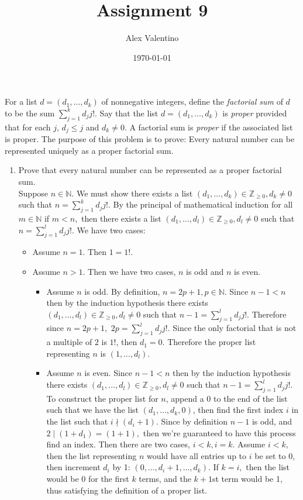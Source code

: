 \documentclass[12pt, letterpaper]{article}
\date{\today}
\author{Alex Valentino}
\title{Assignment 9}
\newcommand{\Z}{\mathbb{Z}}
\newcommand{\N}{\mathbb{N}}
\begin{document}
	For a list $d=(d_1,\ldots,d_k)$ of nonnegative integers, define the \emph{factorial sum} of $d$ to be the sum $\sum_{j=1}^k d_j j!$.  Say that the list $d=(d_1,\ldots,d_k)$ is \emph{proper}
provided that for each $j$, $d_j\leq j$ and $d_k \neq 0$.  A factorial sum is \emph{proper} if the associated list is proper. The purpose of this problem is to prove: Every natural number can be represented uniquely as a proper factorial sum.
\begin{enumerate}
\item
Prove that every natural number can be represented as a proper factorial sum. \\
	Suppose $n \in \N.$  We must show there exists a list $(d_1,\ldots,d_k) \in \Z_{\geq 0}, d_k \neq 0$ such that $n = \sum_{j=1}^k d_j j!.$  By the principal of mathematical induction for all $m \in \N$ if $m < n,$ then there exists a list  $(d_1,\ldots,d_l) \in \Z_{\geq 0}, d_l \neq 0$ such that $n = \sum_{j=1}^l d_j j!.$  We have two cases:
	\begin{itemize}
		\item Assume $n=1.$  Then $1=1!.$
		\item Assume $n>1.$  Then we have two cases, $n$ is odd and $n$ is even. \begin{itemize}
			\item  Assume $n$ is odd.  By definition, $n=2p+1, p \in \N.$  Since $n-1 < n$ then by the induction hypothesis there exists  $(d_1,\ldots,d_l) \in \Z_{\geq 0}, d_l \neq 0$ such that $n-1 = \sum_{j=1}^l d_j j!.$  Therefore since $n=2p+1,$ $2p = \sum_{j=1}^l d_j j!.$  Since the only factorial that is not a multiple of $2$ is $1!$, then $d_1 = 0.$  Therefore the proper list representing $n$ is $(1,\ldots,d_l)$.
			\item Assume $n$ is even.  Since $n-1 < n$ then by the induction hypothesis there exists  $(d_1,\ldots,d_l) \in \Z_{\geq 0}, d_l \neq 0$ such that $n-1 = \sum_{j=1}^l d_j j!.$ To construct the proper list for $n$, append a 0 to the end of the list such that we have the list $(d_1,\ldots, d_k,0)$, then find the first index $i$ in the list such that $i \nmid (d_i + 1)$.  Since by definition $n-1$ is odd, and $2 \mid (1+d_1) = (1+1),$ then we're guaranteed to have this process find an index.  Then there are two cases, $i < k, i = k.$  Assume $i < k,$ then the list representing $n$ would have all entries up to $i$ be set to 0, then increment $d_i$ by 1: $(0,\ldots, d_i +1, \ldots, d_k)$.  If  $k=i,$ then the list would be 0 for the first $k$ terms, and the $k+1$st term would be 1, thus satisfying the definition of a proper list. 

\end{itemize}
\end{itemize}
\end{enumerate}
\end{document}
